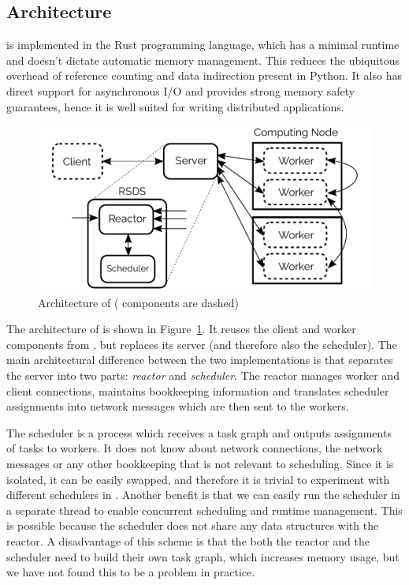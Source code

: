 \subsection*{Architecture}
\rsds{} is implemented in the Rust programming language, which has a minimal
runtime and doesn't dictate automatic memory management. This reduces the ubiquitous overhead of
reference counting and data indirection present in Python. It also has direct support for
asynchronous I/O and provides strong memory safety guarantees, hence it is well suited for writing
distributed applications.

\begin{figure}
	\centering
	\includegraphics[width=0.8\linewidth]{./imgs/rsds/rsds-architecture}
	\caption{Architecture of \rsds{} (\dask{} components are dashed)}
	\label{fig:rsds-architecture}
\end{figure}

The architecture of \rsds{} is shown in Figure~\ref{fig:rsds-architecture}. It
reuses the client and worker components from \dask{}, but replaces its server
(and therefore also the scheduler). The main architectural difference between the two
implementations is that \rsds{} separates the server into two parts:
\emph{reactor} and \emph{scheduler}. The reactor manages worker and client
connections, maintains bookkeeping information and translates scheduler assignments into
\dask{} network messages which are then sent to the workers.

The scheduler is a process which receives a task graph and outputs assignments of tasks to workers.
It does not know about network connections, the \dask{} network messages or any
other bookkeeping that is not relevant to scheduling. Since it is isolated, it can be easily
swapped, and therefore it is trivial to experiment with different schedulers in
\rsds{}. Another benefit is that we can easily run the scheduler in a separate
thread to enable concurrent scheduling and runtime management. This is possible because the
scheduler does not share any data structures with the reactor. A disadvantage of this scheme is
that the both the reactor and the scheduler need to build their own task graph, which increases
memory usage, but we have not found this to be a problem in practice.

